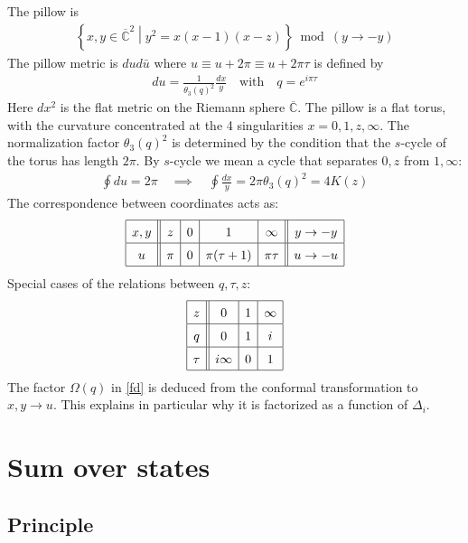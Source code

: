 \documentclass[12pt,a4paper]{article}
\begin{document}
The pillow is 
\begin{align}
 \left\{x,y\in \overline{\mathbb{C}}^2\middle| y^2=x(x-1)(x-z) \right\}\bmod (y\to -y)
\end{align}
The pillow metric is $dud\bar u$ where $u\equiv u+2\pi \equiv u+2\pi\tau$ is defined by 
\begin{align}
 du = \frac{1}{\theta_3(q)^2} \frac{dx}{y} \quad \text{with} \quad q=e^{i\pi\tau}
 \label{dudx}
\end{align}
Here $dx^2$ is the flat metric on the Riemann sphere $\overline{\mathbb{C}}$. The pillow is a flat torus, with the curvature concentrated at the 4 singularities $x=0,1,z,\infty$. The normalization factor $\theta_3(q)^2$ is determined by the condition that the $s$-cycle of the torus has length $2\pi$. By $s$-cycle we mean a cycle that separates $0,z$ from $1,\infty$:
\begin{align}
  \oint du = 2\pi \quad \implies \quad \oint \frac{dx}{y} =  2\pi\theta_3(q)^2 = 4K(z)
\end{align}
The correspondence between coordinates acts as:
\begin{align}
\renewcommand{\arraystretch}{1.5}
 \begin{array}{|c||c|c|c|c||c|}
 \hline 
  x,y & z & 0 & 1 & \infty & y\to -y 
  \\
  \hline 
   u &  \pi & 0 & \pi(\tau+1) & \pi\tau & u \to -u
   \\
   \hline 
 \end{array}
\end{align}
Special cases of the relations between $q,\tau,z$:
\begin{align}
 \renewcommand{\arraystretch}{1.5}
 \begin{array}{|c||c|c|c|}
 \hline 
  z & 0 & 1 & \infty 
  \\
  \hline 
  q & 0 & 1 & i 
  \\
  \hline 
  \tau & i\infty & 0 & 1 
  \\
  \hline 
 \end{array}
\end{align}
The factor $\Omega(q)$ in \eqref{fd} is deduced from the conformal transformation to $x,y\to u$. This explains in particular why it is factorized as a function of $\Delta_i$. 

\section{Sum over states}

\subsection{Principle}
\end{document}
